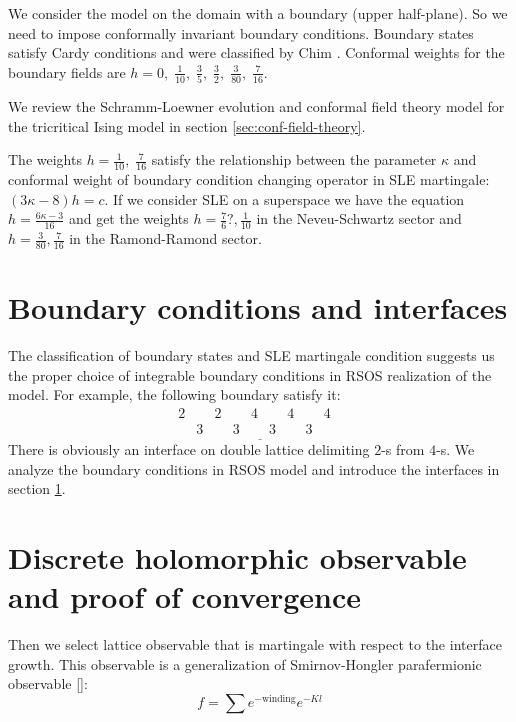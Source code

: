 \documentclass[12pt]{article}
\begin{document}
We consider the model on the domain with a boundary (upper half-plane). So we need to impose
conformally invariant boundary conditions. Boundary states satisfy Cardy conditions and were
classified by Chim \cite{chim1996boundary}. Conformal weights for the boundary fields are $h=0,\;
\frac{1}{10},\; \frac{3}{5},\; \frac{3}{2},\; \frac{3}{80},\; \frac{7}{16}$.

We review the Schramm-Loewner evolution and conformal field theory model for the tricritical Ising
model in section \ref{sec:conf-field-theory}. 

The weights $h=\frac{1}{10},\; \frac{7}{16}$ satisfy the relationship between the parameter $\kappa$
and conformal weight of boundary condition changing operator in SLE martingale: $(3\kappa-8) h =c$.
If we consider SLE on a superspace we have the equation $h=\frac{6\kappa-3}{16}$ and get the weights
$h=\frac{7}{6}?, \frac{1}{10}$ in the Neveu-Schwartz sector and $h=\frac{3}{80}, \frac{7}{16}$ in
the Ramond-Ramond sector.

\section{Boundary conditions and interfaces}
\label{sec:bound-cond-interf}


The classification of boundary states and SLE martingale condition suggests us the proper choice of
integrable boundary conditions in RSOS realization of the model. For example, the following boundary
satisfy it:
\begin{equation}
  \label{eq:2}
  \underline{\begin{array}{llllllllll}
    2 & & 2 & & 4 & & 4 & & 4\\
    &  3 & & 3 & & 3 & & 3 & &
  \end{array}}
\end{equation}
There is obviously an interface on double lattice delimiting $2$-s from $4$-s. We analyze the
boundary conditions in RSOS model and  introduce the interfaces in section
\ref{sec:bound-cond-interf}. 

\section{Discrete holomorphic observable and proof of convergence}
\label{sec:discr-holom-observ}

 Then we
select lattice observable that is martingale with respect to the interface growth.
This observable is a generalization of Smirnov-Hongler parafermionic observable []:
\begin{equation}
  \label{eq:3}
  f = \sum e^{-\mbox{winding}} e^{-Kl}
\end{equation}
\end{document}

